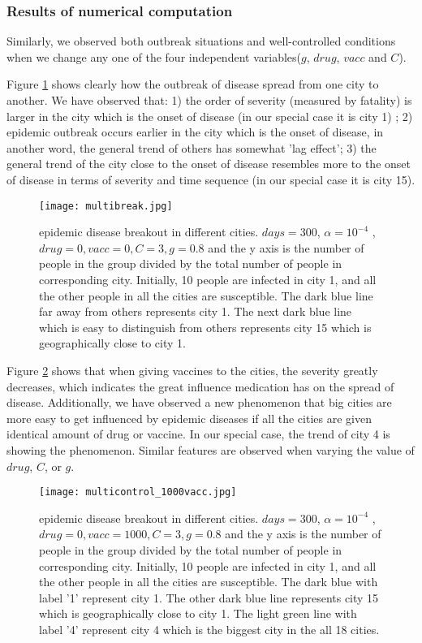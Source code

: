 \subsubsection{Results of numerical computation}
Similarly, we observed both outbreak situations and well-controlled conditions when we change any one of the four independent variables($g$, $drug$, $vacc$ and $C$).

Figure \ref{multibreak} shows clearly how the outbreak of disease spread from one city to another. We have observed that: 1) the order of severity (measured by fatality) is larger in the city which is the onset of disease (in our special case it is city 1) ; 2) epidemic outbreak occurs earlier in the city which is the onset of disease, in another word, the general trend of others has somewhat 'lag effect'; 3) the general trend of the city close to the onset of disease resembles more to the onset of disease in terms of severity and time sequence (in our special case it is city 15).

\begin{figure}
\centering
\texttt{[image: multibreak.jpg]}
\caption{epidemic disease breakout in different cities. $days = 300$, $\alpha = 10^{-4}$ , $drug = 0, vacc = 0, C = 3, g = 0.8$ and the y axis is the number of people in the group divided by the total number of people in corresponding city. Initially, 10 people are infected in city 1, and all the other people in all the cities are susceptible. The dark blue line far away from others represents city 1. The next dark blue line which is easy to distinguish from others represents city 15 which is geographically close to city 1.}
\label{multibreak}
\end{figure}

Figure \ref{multicontrol_1000vacc} shows that when giving vaccines to the cities, the severity greatly decreases, which indicates the great influence medication has on the spread of disease. Additionally, we have observed a new phenomenon that big cities are more easy to get influenced by epidemic diseases if all the cities are given identical amount of drug or vaccine. In our special case, the trend of city 4 is showing the phenomenon. Similar features are observed when varying the value of $drug$, $C$, or $g$.

\begin{figure}
\centering
\texttt{[image: multicontrol\_1000vacc.jpg]}
\caption{epidemic disease breakout in different cities. $days = 300$, $\alpha = 10^{-4}$ , $drug = 0, vacc = 1000, C = 3, g = 0.8$ and the y axis is the number of people in the group divided by the total number of people in corresponding city. Initially, 10 people are infected in city 1, and all the other people in all the cities are susceptible. The dark blue with label '1' represent city 1. The other dark blue line represents city 15 which is geographically close to city 1. The light green line with label '4' represent city 4 which is the biggest city in the all 18 cities.}
\label{multicontrol_1000vacc}
\end{figure}

